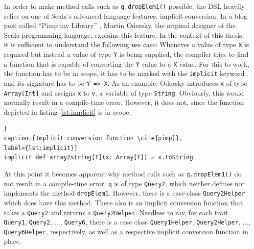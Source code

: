 \documentclass[article, 10pt, type=bsc, colorback, accentcolor=tud8b, parskip=half, bibliography=totocnumbered]{tudthesis}
\begin{document}
In order to make method calls such as \lstinline{q.dropElem1()} possible, the DSL heavily relies on one of Scala's advanced language features, implicit conversion.
In a blog post called ``Pimp my Library'' \cite{pimp}, Martin Odersky, the original designer of the Scala programming language, explains this feature.
In the context of this thesis, it is sufficient to understand the following use case: Whenever a value of type \lstinline{X} is required but instead a value of type \lstinline{Y} is being supplied, the compiler tries to find a function that is capable of converting the \lstinline{Y} value to a \lstinline{X} value.
For this to work, the function has to be in scope, it has to be marked with the \lstinline{implicit} keyword and its signature has to be \lstinline{Y => X}.
As an example, Odersky introduces \lstinline{x} of type \lstinline{Array[Int]} and assigns \lstinline{x} to \lstinline{v}, a variable of type \lstinline{String}.
Obviously, this would normally result in a compile-time error.
However, it does not, since the function depicted in listing \ref{lst:implicit} is in scope.

\begin{lstlisting}[
caption={Implicit conversion function \cite{pimp}},
label={lst:implicit}]
implicit def array2string[T](x: Array[T]) = x.toString
\end{lstlisting}

At this point it becomes apparent why method calls such as \lstinline{q.dropElem1()} do not result in a compile-time error:
\lstinline{q} is of type \lstinline{Query2}, which neither defines nor implements the method \lstinline{dropElem1}.
However, there is a case class \lstinline{Query2Helper} which does have this method.
There also is an implicit conversion function that takes a \lstinline{Query2} and returns a \lstinline{Query2Helper}.
Needless to say, for each trait \lstinline{Query1}, \lstinline{Query2}, ..., \lstinline{Query6}, there is a case class \lstinline{Query1Helper}, \lstinline{Query2Helper}, ..., \lstinline{Query6Helper}, respectively, as well as a respective implicit conversion function in place.
\end{document}

